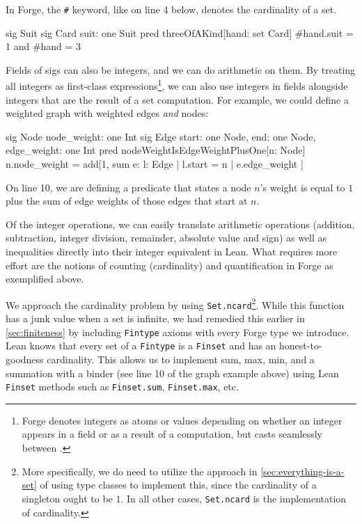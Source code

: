 In Forge, the \texttt{\#} keyword, like on line 4 below, denotes the cardinality of a set. 

\begin{forge}
sig Suit {}
sig Card { suit: one Suit }
pred threeOfAKind[hand: set Card] {
  #hand.suit = 1 and #hand = 3
}
\end{forge}

Fields of sigs can also be integers, and we can do arithmetic on them. By treating all integers as first-class expressions\footnote{Forge denotes integers as atoms or values depending on whether an integer appears in a field or as a result of a computation, but casts seamlessly between \cite{forge-docs,nelson2024artifact}.}, we can also use integers in fields alongside integers that are the result of a set computation. For example, we could define a weighted graph with weighted edges \emph{and} nodes:

\begin{forge}
sig Node {
  node_weight: one Int
}
sig Edge {
  start: one Node,
  end: one Node,
  edge_weight: one Int
}
pred nodeWeightIsEdgeWeightPlusOne[n: Node] {
  n.node_weight = add[1, sum e: { l: Edge | l.start = n } | { e.edge_weight }]
}
\end{forge}

On line 10, we are defining a predicate that states a node $n$'s weight is equal to $1$ plus the sum of edge weights of those edges that start at $n$. 

Of the integer operations, we can easily translate arithmetic operations (addition, subtraction, integer division, remainder, absolute value and sign) as well as inequalities directly into their integer equivalent in Lean. What requires more effort are the notions of counting (cardinality) and quantification in Forge as exemplified above. 

We approach the cardinality problem by using \texttt{Set.ncard}\footnote{More specifically, we do need to utilize the approach in \cref{sec:everything-is-a-set} of using type classes to implement this, since the cardinality of a singleton ought to be $1$. In all other cases, \texttt{Set.ncard} is the implementation of cardinality.}. While this function has a junk value when a set is infinite, we had remedied this earlier in \cref{sec:finiteness} by including \texttt{Fintype} axioms with every Forge type we introduce. Lean knows that every set of a \texttt{Fintype} is a \texttt{Finset} and has an honest-to-goodness cardinality. This allows us to implement sum, max, min, and a summation with a binder (see line 10 of the graph example above) using Lean \texttt{Finset} methods such as \texttt{Finset.sum}, \texttt{Finset.max}, etc. 

